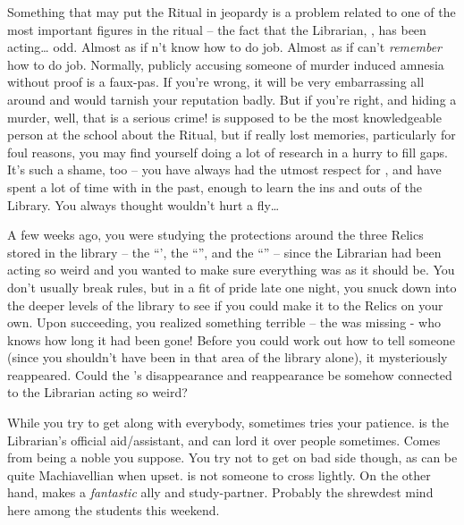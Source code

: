 \documentclass[char]{GL2020}
\begin{document}
Something that may put the Ritual in jeopardy is a problem related to one of the most important figures in the ritual -- the fact that the Librarian, \cLibrarian{\full}, has been acting\ldots{} odd. Almost as if \cLibrarian{\they} \cLibrarian{\does}n't know how to do \cLibrarian{\their} job. Almost as if \cLibrarian{\they} can't \emph{remember} how to do \cLibrarian{\their} job. Normally, publicly accusing someone of murder induced amnesia without proof is a faux-pas. If you're wrong, it will be very embarrassing all around and would tarnish your reputation badly. But if you're right, and \cLibrarian{\theyare} hiding a murder, well, that is a serious crime! \cLibrarian{} is supposed to be the most knowledgeable person at the school about the Ritual, but if \cLibrarian{\they} really \cLibrarian{\have} lost \cLibrarian{\their} memories, particularly for foul reasons, you may find yourself doing a lot of research in a hurry to fill gaps. It's such a shame, too -- you have always had the utmost respect for \cLibrarian{}, and have spent a lot of time with \cLibrarian{\them} in the past, enough to learn the ins and outs of the Library. You always thought \cLibrarian{\they} wouldn't hurt a fly\ldots{}

A few weeks ago, you were studying the protections around the three Relics stored in the library – the ``\iNet{}', the ``\iLariat{}'', and the ``\iScythe{}'' – since the Librarian had been acting so weird and you wanted to make sure everything was as it should be. You don't usually break rules, but in a fit of pride late one night, you snuck down into the deeper levels of the library to see if you could make it to the Relics on your own. Upon succeeding, you realized something terrible – the \iScythe{} was missing - who knows how long it had been gone! Before you could work out how to tell someone (since you shouldn't have been in that area of the library alone), it mysteriously reappeared. Could the \iScythe{}'s disappearance and reappearance be somehow connected to the Librarian acting so weird?

While you try to get along with everybody, \cLibAssist{\full} sometimes tries your patience. \cLibAssist{} is the Librarian's official aid/assistant, and \cLibAssist{\they} can lord it over people sometimes. Comes from being a \pFarm{} noble you suppose. You try not to get on \cLibAssist{\their} bad side though, as \cLibAssist{\they}  can be quite Machiavellian when upset. \cLibAssist{} is not someone to cross lightly. On the other hand, \cLibAssist{} makes a \emph{fantastic} ally and study-partner. Probably the shrewdest mind here among the students this weekend.
\end{document}
